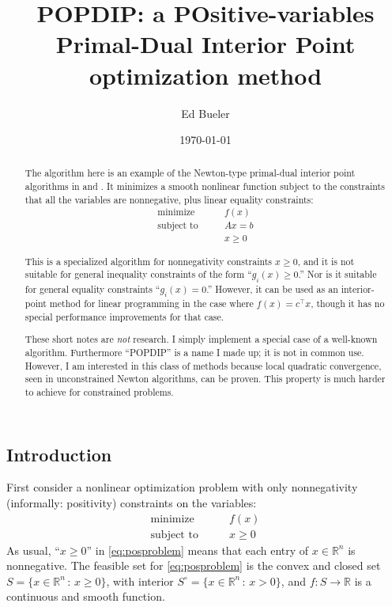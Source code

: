 \documentclass[11pt]{article}
\title{POPDIP: a POsitive-variables \\ Primal-Dual Interior Point optimization method}
\author{Ed Bueler}
\date{\today}
\newcommand{\RR}{\mathbb{R}}
\begin{document}
\maketitle

\begin{abstract}
The algorithm here is an example of the Newton-type primal-dual interior point algorithms in \cite[Algorithm 16.1, section 16.7]{GrivaNashSofer2009} and \cite{YamashitaYabe1996}.  It minimizes a smooth nonlinear function subject to the constraints that all the variables are nonnegative, plus linear equality constraints:
\begin{equation}
\begin{matrix}
\text{minimize} \qquad   & f(x) \\
\text{subject to} \qquad & A x = b \\
                         & x \ge 0
\end{matrix} \label{eq:problem}
\end{equation}

This is a specialized algorithm for nonnegativity constraints $x\ge 0$, and it is not suitable for general inequality constraints of the form ``$g_i(x)\ge 0$.''  Nor is it suitable for general equality constraints ``$g_i(x)=0$.''  However, it can be used as an interior-point method for linear programming in the case where $f(x)=c^\top x$, though it has no special performance improvements for that case.

These short notes are \emph{not} research.  I simply implement a special case of a well-known algorithm.  Furthermore ``POPDIP'' is a name I made up; it is not in common use.  However, I am interested in this class of methods because local quadratic convergence, seen in unconstrained Newton algorithms, can be proven.  This property is much harder to achieve for constrained problems.
\end{abstract}

\thispagestyle{empty}

\bigskip
\subsection*{Introduction}

First consider a nonlinear optimization problem with only nonnegativity (informally: positivity) constraints on the variables:
\begin{equation}
\begin{matrix}
\text{minimize} \qquad & f(x) \\
\text{subject to} \qquad & x \ge 0
\end{matrix} \label{eq:posproblem}
\end{equation}
As usual, ``$x\ge 0$'' in \eqref{eq:posproblem} means that each entry of $x\in\RR^n$ is nonnegative.  The feasible set for \eqref{eq:posproblem} is the convex and closed set $S = \{x\in \RR^n\,:\,x\ge 0\}$, with interior $S^\circ = \{x\in \RR^n\,:\,x > 0\}$, and $f:S \to \RR$ is a continuous and smooth function.
\end{document}
